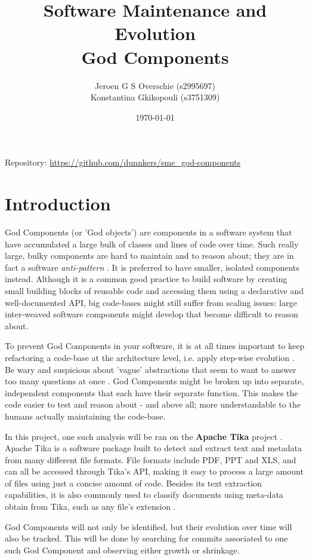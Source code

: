 \documentclass{article}
\title{Software Maintenance and Evolution \\God Components}
\author{Jeroen G S Overschie (s2995697)\\ Konstantina Gkikopouli (s3751309)}
\date{\today}
\begin{document}
\maketitle
Repository: \small{\url{https://github.com/dunnkers/sme_god-components}}
\tableofcontents
\newpage

\section{Introduction}
God Components (or 'God objects') are components in a software system that have accumulated a large bulk of classes and lines of code over time. Such really large, bulky components are hard to maintain and to reason about; they are in fact a software \textit{anti-pattern} \citep{smith2000software}. It is preferred to have smaller, isolated components instead. Although it is a common good practice to build software by creating small building blocks of reusable code and accessing them using a declarative and well-documented API, big code-bases might still suffer from scaling issues: large inter-weaved software components might develop that become difficult to reason about.

To prevent God Components in your software, it is at all times important to keep refactoring a code-base at the architecture level, i.e. apply step-wise evolution \citep{toward_a_catalogue_of_architetural_bad_smells}. Be wary and suspicious about 'vague' abstractions that seem to want to answer too many questions at once \citep{riel1996object}. God Components might be broken up into separate, independent components that each have their separate function. This makes the code easier to test and reason about - and above all; more understandable to the humans actually maintaining the code-base.

In this project, one such analysis will be ran on the \textbf{Apache Tika} project \citep{apache_software_foundation_2020}. Apache Tika is a software package built to detect and extract text and metadata from many different file formats. File formats include PDF, PPT and XLS, and can all be accessed through Tika's API, making it easy to process a large amount of files using just a concise amount of code. Besides its text extraction capabilities, it is also commonly used to classify documents using meta-data obtain from Tika, such as any file's extension \citep{Tika}.

God Components will not only be identified, but their evolution over time will also be tracked. This will be done by searching for commits associated to one such God Component and observing either growth or shrinkage.
\end{document}
